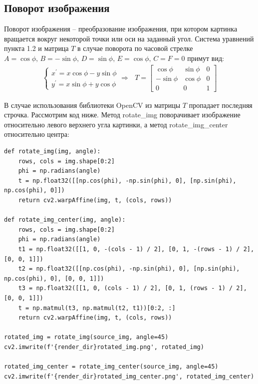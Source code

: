 \documentclass[a4paper, 16pt]{article}
\begin{document}
\subsection{Поворот изображения}
\noindent Поворот изображения -- преобразование изображения, при котором картинка
вращается вокруг некоторой точки или оси на заданный угол. Система уравнений пункта 1.2
и матрица $T$ в случае поворота по часовой стрелке $A=\cos{\phi},\,B=-\sin{\phi},\,D=\sin{\phi},\,E=\cos{\phi},\,C=F=0$
примут вид:
\begin{align*}
    \begin{cases}
        x^{\prime}=x\cos{\phi}-y\sin{\phi}\\
        y^{\prime}=x\sin{\phi}+y\cos{\phi}
    \end{cases}\Rightarrow\,\,\,\,
    T=
    \begin{bmatrix}
        \cos{\phi} &\sin{\phi} &0\\
        -\sin{\phi} &\cos{\phi} &0\\
        0 &0 &1
    \end{bmatrix}
\end{align*}


\noindent В случае использования библиотеки OpenCV из матрицы $T$ пропадает последняя строчка.
Рассмотрим код ниже. Метод rotate\_{img} поворачивает изображение относительно левого верхнего угла картинки,
а метод rotate\_{img}\_{center} относительно центра:
\begin{lstlisting}[label=rotate-code,caption=Код для поворота изображения]
def rotate_img(img, angle):
    rows, cols = img.shape[0:2]
    phi = np.radians(angle)
    t = np.float32([[np.cos(phi), -np.sin(phi), 0], [np.sin(phi), np.cos(phi), 0]])
    return cv2.warpAffine(img, t, (cols, rows))

def rotate_img_center(img, angle):
    rows, cols = img.shape[0:2]
    phi = np.radians(angle)
    t1 = np.float32([[1, 0, -(cols - 1) / 2], [0, 1, -(rows - 1) / 2], [0, 0, 1]])
    t2 = np.float32([[np.cos(phi), -np.sin(phi), 0], [np.sin(phi), np.cos(phi), 0], [0, 0, 1]])
    t3 = np.float32([[1, 0, (cols - 1) / 2], [0, 1, (rows - 1) / 2], [0, 0, 1]])
    t = np.matmul(t3, np.matmul(t2, t1))[0:2, :]
    return cv2.warpAffine(img, t, (cols, rows))

rotated_img = rotate_img(source_img, angle=45)
cv2.imwrite(f'{render_dir}rotated_img.png', rotated_img)

rotated_img_center = rotate_img_center(source_img, angle=45)
cv2.imwrite(f'{render_dir}rotated_img_center.png', rotated_img_center)
\end{lstlisting}
\end{document}
